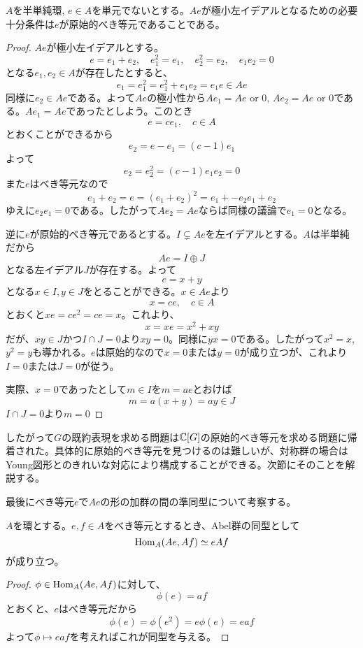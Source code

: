 \documentclass{ltjsarticle}
\begin{document}
\begin{prop}
  $A$を半単純環, $e\in A$を単元でないとする。$Ae$が極小左イデアルとなるための必要十分条件は$e$が原始的べき等元であることである。
\end{prop}

\begin{proof}
  $Ae$が極小左イデアルとする。
  \[
    e=e_1+e_2,\quad e_1^2=e_1,\quad e_2^2=e_2,\quad e_1e_2=0
  \]
  となる$e_1,e_2\in A$が存在したとすると、
  \[
  e_1=e_1^2=e_1^2+e_1e_2=e_1e\in Ae  
  \]
  同様に$e_2\in Ae$である。よって$Ae$の極小性から$Ae_1=Ae\text{ or }0$, $Ae_2=Ae\text{ or }0$である。$Ae_1=Ae$であったとしよう。このとき
  \[
  e=ce_1,\quad c\in A  
  \]
  とおくことができるから
  \[
  e_2=e-e_1=(c-1)e_1
  \]
  よって
  \[
  e_2=e_2^2=(c-1)e_1e_2=0
  \]
  また$e$はべき等元なので
  \[
  e_1+e_2=e=(e_1+e_2)^2=e_1+-e_2e_1+e_2
  \]
  ゆえに$e_2e_1=0$である。したがって$Ae_2=Ae$ならば同様の議論で$e_1=0$となる。

  逆に$e$が原始的べき等元であるとする。$I\subsetneq Ae$を左イデアルとする。$A$は半単純だから
  \[
  Ae=I\oplus J  
  \]
  となる左イデアル$J$が存在する。よって
  \[
  e=x+y
  \]
  となる$x\in I, y\in J$をとることができる。$x\in Ae$より
  \[
  x=ce,\quad c\in A  
  \]
  とおくと$xe=ce^2=ce=x$。これより、
  \[
  x=xe=x^2+xy  
  \]
  だが、$xy\in J$かつ$I\cap J=0$より$xy=0$。同様に$yx=0$である。したがって$x^2=x$, $y^2=y$も導かれる。$e$は原始的なので$x=0$または$y=0$が成り立つが、これより$I=0$または$J=0$が従う。

  実際、$x=0$であったとして$m\in I$を$m=ae$とおけば
  \[
  m=a(x+y)=ay\in J  
  \]
  $I\cap J=0$より$m=0$
\end{proof}

したがって$G$の既約表現を求める問題は$\mathbb{C}[G]$の原始的べき等元を求める問題に帰着された。具体的に原始的べき等元を見つけるのは難しいが、対称群の場合はYoung図形とのきれいな対応により構成することができる。次節にそのことを解説する。

最後にべき等元$e$で$Ae$の形の加群の間の準同型について考察する。

\begin{prop}\label{hom_of_cyclic_module}
  $A$を環とする。$e,f\in A$をべき等元とするとき、Abel群の同型として
  \[
  \text{Hom}_A(Ae,Af)\simeq eAf
  \]
  が成り立つ。
\end{prop}

\begin{proof}
  $\phi\in\text{Hom}_A(Ae,Af)$に対して、
  \[
  \phi(e)=af  
  \]
  とおくと、$e$はべき等元だから
  \[
  \phi(e)=\phi(e^2)=e\phi(e)=eaf  
  \]
  よって$\phi\mapsto eaf$を考えればこれが同型を与える。
\end{proof}
\end{document}

